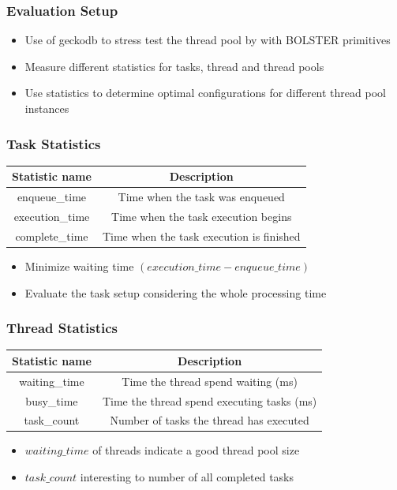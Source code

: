 \documentclass{beamer}
\begin{document}
\begin{frame}
	\frametitle{Evaluation Setup}
	\begin{itemize}
		\item Use of geckodb to stress test the thread pool by with BOLSTER primitives
		\item Measure different statistics for tasks, thread and thread pools
		\item Use statistics to determine optimal configurations for different thread pool instances
	\end{itemize}
\end{frame}

\begin{frame}
	\frametitle{Task Statistics}
	\begin{center}
		\begin{tabular}{ c c }
			\hline
			\textbf{Statistic name}&\textbf{Description}\\
			\hline
			enqueue\_time & Time when the task was enqueued \\
			execution\_time & Time when the task execution begins \\
			complete\_time & Time when the task execution is finished \\
			\hline
		\end{tabular}
		\label{tab2}
	\end{center}
	\begin{itemize}
		\item Minimize waiting time $(execution\_time - enqueue\_time)$
		\item Evaluate the task setup considering the whole processing time 
	\end{itemize}
\end{frame}

\begin{frame}
	\frametitle{Thread Statistics}
	\begin{center}
		\begin{tabular}{ c c }
			\hline
			\textbf{Statistic name}&\textbf{Description}\\
			\hline
			waiting\_time & Time the thread spend waiting (ms) \\
			busy\_time & Time the thread spend executing tasks (ms)\\
			task\_count & Number of tasks the thread has executed \\
			\hline
		\end{tabular}
		\label{tab3}
	\end{center}
	\begin{itemize}
		\item $waiting\_time$ of threads indicate a good thread pool size
		\item $task\_count$ interesting to number of all completed tasks
	\end{itemize}
\end{frame}
\end{document}
